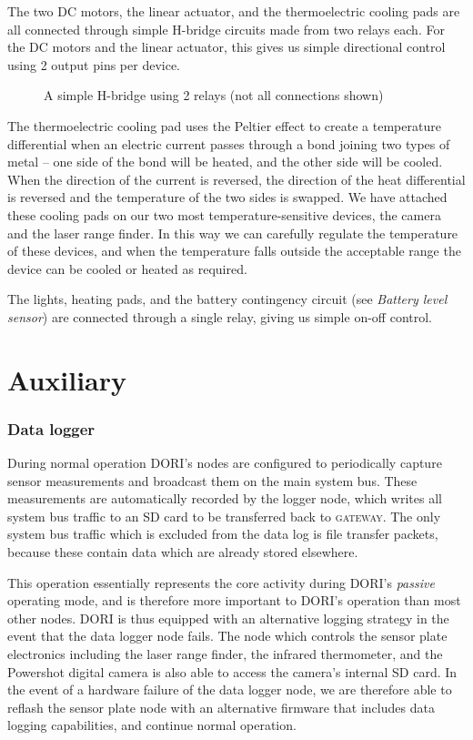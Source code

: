     The two DC motors, the linear actuator, and the thermoelectric cooling pads are all connected through simple H-bridge circuits made from two relays each. For the DC motors and the linear actuator, this gives us simple directional control using 2 output pins per device.

\begin{figure}[h]
    \centering
    
    \caption[H-bridge circuit]{A simple H-bridge using 2 relays (not all connections shown)}
\end{figure}

    
    The thermoelectric cooling pad uses the Peltier effect to create a temperature differential when an electric current passes through a bond joining two types of metal -- one side of the bond will be heated, and the other side will be cooled. When the direction of the current is reversed, the direction of the heat differential is reversed and the temperature of the two sides is swapped. We have attached these cooling pads on our two most temperature-sensitive devices, the camera and the laser range finder. In this way we can carefully regulate the temperature of these devices, and when the temperature falls outside the acceptable range the device can be cooled or heated as required.

    The lights, heating pads, and the battery contingency circuit (see \emph{Battery level sensor}) are connected through a single relay, giving us simple on-off control.

\section{Auxiliary}
    \subsubsection*{Data logger}
    During normal operation DORI's nodes are configured to periodically capture sensor measurements and broadcast them on the main system bus. These measurements are automatically recorded by the logger node, which writes all system bus traffic to an SD card to be transferred back to \textsc{gateway}. The only system bus traffic which is excluded from the data log is file transfer packets, because these contain data which are already stored elsewhere.

    This operation essentially represents the core activity during DORI's \emph{passive} operating mode, and is therefore more important to DORI's operation than most other nodes. DORI is thus equipped with an alternative logging strategy in the event that the data logger node fails. The node which controls the sensor plate electronics including the laser range finder, the infrared thermometer, and the Powershot digital camera is also able to access the camera's internal SD card. In the event of a hardware failure of the data logger node, we are therefore able to reflash the sensor plate node with an alternative firmware that includes data logging capabilities, and continue normal operation.

